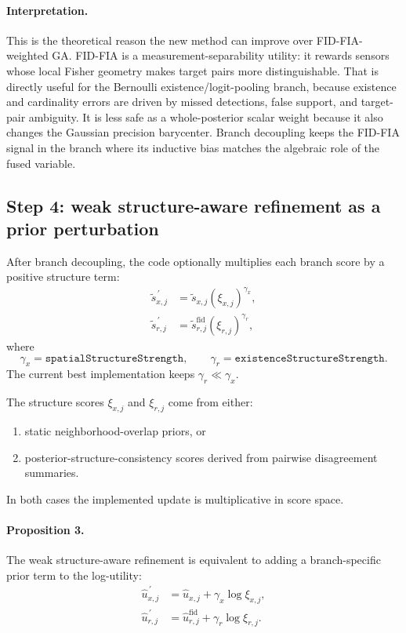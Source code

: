 \paragraph{Interpretation.}
This is the theoretical reason the new method can improve over FID-FIA-weighted GA. FID-FIA is a measurement-separability utility: it rewards sensors whose local Fisher geometry makes target pairs more distinguishable. That is directly useful for the Bernoulli existence/logit-pooling branch, because existence and cardinality errors are driven by missed detections, false support, and target-pair ambiguity. It is less safe as a whole-posterior scalar weight because it also changes the Gaussian precision barycenter. Branch decoupling keeps the FID-FIA signal in the branch where its inductive bias matches the algebraic role of the fused variable.

\subsection*{Step 4: weak structure-aware refinement as a prior perturbation}

After branch decoupling, the code optionally multiplies each branch score by a positive structure term:
\begin{align}
\tilde s_{x,j}^{\,\prime} &= \tilde s_{x,j} \left(\xi_{x,j}\right)^{\gamma_x}, \\
\tilde s_{r,j}^{\,\prime} &= \tilde s_{r,j}^{\mathrm{fid}} \left(\xi_{r,j}\right)^{\gamma_r},
\end{align}
where
\begin{equation}
\gamma_x = \texttt{spatialStructureStrength},
\qquad
\gamma_r = \texttt{existenceStructureStrength}.
\end{equation}
The current best implementation keeps $\gamma_r \ll \gamma_x$.

The structure scores $\xi_{x,j}$ and $\xi_{r,j}$ come from either:
\begin{enumerate}
\item static neighborhood-overlap priors, or
\item posterior-structure-consistency scores derived from pairwise disagreement summaries.
\end{enumerate}
In both cases the implemented update is multiplicative in score space.

\paragraph{Proposition 3.}
The weak structure-aware refinement is equivalent to adding a branch-specific prior term to the log-utility:
\begin{align}
\hat u_{x,j}^{\,\prime} &= \hat u_{x,j} + \gamma_x \log \xi_{x,j}, \\
\hat u_{r,j}^{\,\prime} &= \hat u_{r,j}^{\mathrm{fid}} + \gamma_r \log \xi_{r,j}.
\end{align}

